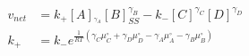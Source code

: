 \begin{eqnarray}
v_{net} & = k_+[A]_^{\gamma_A}[B]_{SS}^{\gamma_B} - k_-[C]^{\gamma_C}[D]^{\gamma_D} \\
k_+ &=  k_-e^{\frac{1}{RT}\left(\gamma_C\mu_C^\circ+ \gamma_D\mu_D^\circ -\gamma_A\mu_A^\circ-\gamma_B\mu_B^\circ\right)} \\
\end{eqnarray}